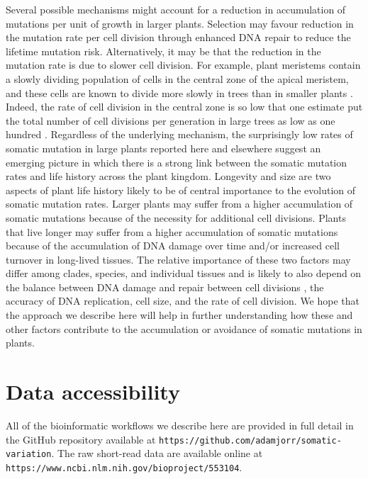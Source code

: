 Several possible mechanisms might account for a reduction in accumulation of mutations per unit of growth in larger plants. Selection may favour reduction in the mutation rate per cell division through enhanced DNA repair to reduce the lifetime mutation risk. Alternatively, it may be that the reduction in the mutation rate is due to slower cell division. For example, plant meristems contain a slowly dividing population of cells in the central zone of the apical meristem, and these cells are known to divide more slowly in trees than in smaller plants \parencite{romberger_plant_1993}. Indeed, the rate of cell division in the central zone is so low that one estimate put the total number of cell divisions per generation in large trees as low as one hundred \parencite{romberger_plant_1993}. Regardless of the underlying mechanism, the surprisingly low rates of somatic mutation in large plants reported here and elsewhere suggest an emerging picture in which there is a strong link between the somatic mutation rates and life history across the plant kingdom. Longevity and size are two aspects of plant life history likely to be of central importance to the evolution of somatic mutation rates. Larger plants may suffer from a higher accumulation of somatic mutations because of the necessity for additional cell divisions. Plants that live longer may suffer from a higher accumulation of somatic mutations because of the accumulation of DNA damage over time and/or increased cell turnover in long-lived tissues. The relative importance of these two factors may differ among clades, species, and individual tissues and is likely to also depend on the balance between DNA damage and repair between cell divisions \parencite{gao_interpreting_2016}, the accuracy of DNA replication, cell size, and the rate of cell division. We hope that the approach we describe here will help in further understanding how these and other factors contribute to the accumulation or avoidance of somatic mutations in plants.

\section{Data accessibility}

All of the bioinformatic workflows we describe here are provided in full detail in the GitHub repository available at \texttt{https://github.com/adamjorr/somatic-variation}. The raw short-read data are available online at \texttt{https://www.ncbi.nlm.nih.gov/bioproject/553104}.

